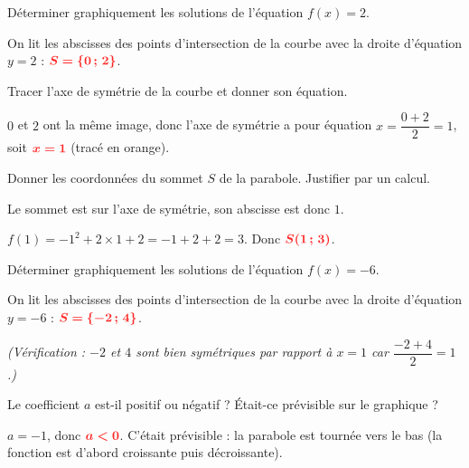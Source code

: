 \documentclass[11pt,a4paper]{book}
\begin{document}
\begin{enumMet}
	\item Déterminer graphiquement les solutions de l'équation $f(x)=2$.

	\begin{corrBox}
		On lit les abscisses des points d'intersection de la courbe avec la droite d'équation $y=2$ : $\mRouge{S=\{0\,;\,2\}}$.
	\end{corrBox}

	\item Tracer l'axe de symétrie de la courbe et donner son équation.

	\begin{corrBox}
		$0$ et $2$ ont la même image, donc l'axe de symétrie a pour équation $x=\dfrac{0+2}{2}=1$, soit $\mRouge{x=1}$ (tracé en orange).
	\end{corrBox}

	\item Donner les coordonnées du sommet $S$ de la parabole. Justifier par un calcul.

	\begin{corrBox}
		Le sommet est sur l'axe de symétrie, son abscisse est donc $1$.

		$f(1)=-1^2+2\times 1+2=-1+2+2=3$. \qquad Donc $\mRouge{S(1\,;\,3)}$.
	\end{corrBox}

	\item Déterminer graphiquement les solutions de l'équation $f(x)=-6$.

	\begin{corrBox}
		On lit les abscisses des points d'intersection de la courbe avec la droite d'équation $y=-6$ : $\mRouge{S=\{-2\,;\,4\}}$.

		\emph{(Vérification : $-2$ et $4$ sont bien symétriques par rapport à $x=1$ car $\dfrac{-2+4}{2}=1$.)}
	\end{corrBox}

	\item Le coefficient $a$ est-il positif ou négatif ? Était-ce prévisible sur le graphique ?

	\begin{corrBox}
		$a=-1$, donc $\mRouge{a<0}$. C'était prévisible : la parabole est \og tournée vers le bas \fg{} (la fonction est d'abord croissante puis décroissante).
	\end{corrBox}
\end{enumMet}

\newpage

\end{document}
